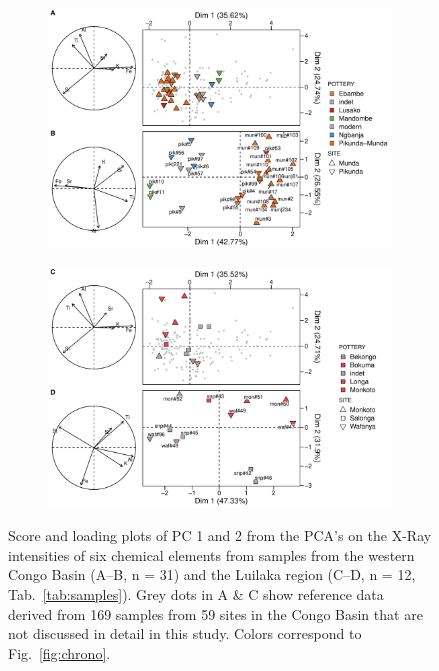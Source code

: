 \documentclass[preprint,10pt,oneside,onecolumn,authoryear]{elsarticle}
\begin{document}
\begin{figure}[p]
	\begin{subfigure}[t]{\textwidth}
		\includegraphics[width=.98\textwidth]{Fig_XRF_pca_pik-mun.pdf}
		\vspace{1em}
		\label{fig:xrf.pca.wCB}
	\end{subfigure}
	\begin{subfigure}[t]{\textwidth}
		\includegraphics[width=.98\textwidth]{Fig_XRF_pca_luilaka.pdf}
		\label{fig:xrf.pca.luilaka}
	\end{subfigure}
	\caption{Score and loading plots of PC 1 and 2 from the PCA's on the X-Ray intensities of six chemical elements from samples from the western Congo Basin (A--B, n = 31) and the Luilaka region (C--D, n = 12, Tab.~\ref{tab:samples}). Grey dots in A \& C show reference data derived from 169 samples from 59 sites in the Congo Basin that are not discussed in detail in this study. Colors correspond to Fig.~\ref{fig:chrono}.}
	\label{fig:xrf.pca}
\end{figure}
\end{document}
